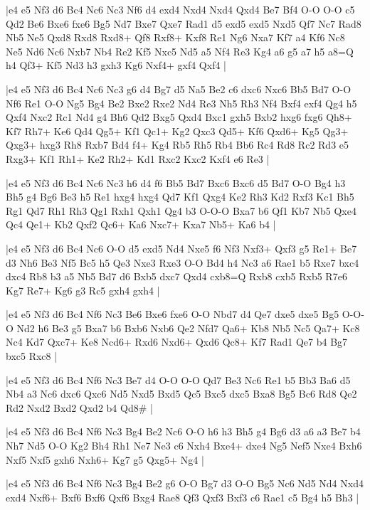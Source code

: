 \whitename{}
\blackname{}
\makegametitle
|e4 e5 Nf3 d6 Bc4 Nc6 Nc3 Nf6 d4 exd4 Nxd4 Nxd4 Qxd4 Be7 Bf4 O-O O-O c5 Qd2 Be6 Bxe6 fxe6 Bg5 Nd7 Bxe7 Qxe7 Rad1 d5 exd5 exd5 Nxd5 Qf7 Nc7 Rad8 Nb5 Ne5 Qxd8 Rxd8 Rxd8+ Qf8 Rxf8+ Kxf8 Re1 Ng6 Nxa7 Kf7 a4 Kf6 Nc8 Ne5 Nd6 Nc6 Nxb7 Nb4 Re2 Kf5 Nxc5 Nd5 a5 Nf4 Re3 Kg4 a6 g5 a7 h5 a8=Q h4 Qf3+ Kf5 Nd3 h3 gxh3 Kg6 Nxf4+ gxf4 Qxf4  |

\whitename{}
\blackname{}
\makegametitle
|e4 e5 Nf3 d6 Bc4 Nc6 Nc3 g6 d4 Bg7 d5 Na5 Be2 c6 dxc6 Nxc6 Bb5 Bd7 O-O Nf6 Re1 O-O Ng5 Bg4 Be2 Bxe2 Rxe2 Nd4 Re3 Nh5 Rh3 Nf4 Bxf4 exf4 Qg4 h5 Qxf4 Nxc2 Rc1 Nd4 g4 Bh6 Qd2 Bxg5 Qxd4 Bxc1 gxh5 Bxb2 hxg6 fxg6 Qh8+ Kf7 Rh7+ Ke6 Qd4 Qg5+ Kf1 Qc1+ Kg2 Qxc3 Qd5+ Kf6 Qxd6+ Kg5 Qg3+ Qxg3+ hxg3 Rh8 Rxb7 Bd4 f4+ Kg4 Rb5 Rh5 Rb4 Bb6 Rc4 Rd8 Rc2 Rd3 e5 Rxg3+ Kf1 Rh1+ Ke2 Rh2+ Kd1 Rxc2 Kxc2 Kxf4 e6 Re3  |

\whitename{}
\blackname{}
\makegametitle
|e4 e5 Nf3 d6 Bc4 Nc6 Nc3 h6 d4 f6 Bb5 Bd7 Bxc6 Bxc6 d5 Bd7 O-O Bg4 h3 Bh5 g4 Bg6 Be3 h5 Re1 hxg4 hxg4 Qd7 Kf1 Qxg4 Ke2 Rh3 Kd2 Rxf3 Kc1 Bh5 Rg1 Qd7 Rh1 Rh3 Qg1 Rxh1 Qxh1 Qg4 b3 O-O-O Bxa7 b6 Qf1 Kb7 Nb5 Qxe4 Qc4 Qe1+ Kb2 Qxf2 Qc6+ Ka6 Nxc7+ Kxa7 Nb5+ Ka6 b4  |

\whitename{}
\blackname{}
\makegametitle
|e4 e5 Nf3 d6 Bc4 Nc6 O-O d5 exd5 Nd4 Nxe5 f6 Nf3 Nxf3+ Qxf3 g5 Re1+ Be7 d3 Nh6 Be3 Nf5 Bc5 h5 Qe3 Nxe3 Rxe3 O-O Bd4 h4 Nc3 a6 Rae1 b5 Rxe7 bxc4 dxc4 Rb8 b3 a5 Nb5 Bd7 d6 Bxb5 dxc7 Qxd4 cxb8=Q Rxb8 cxb5 Rxb5 R7e6 Kg7 Re7+ Kg6 g3 Rc5 gxh4 gxh4  |

\whitename{}
\blackname{}
\makegametitle
|e4 e5 Nf3 d6 Bc4 Nf6 Nc3 Be6 Bxe6 fxe6 O-O Nbd7 d4 Qe7 dxe5 dxe5 Bg5 O-O-O Nd2 h6 Be3 g5 Bxa7 b6 Bxb6 Nxb6 Qe2 Nfd7 Qa6+ Kb8 Nb5 Nc5 Qa7+ Kc8 Nc4 Kd7 Qxc7+ Ke8 Ncd6+ Rxd6 Nxd6+ Qxd6 Qc8+ Kf7 Rad1 Qe7 b4 Bg7 bxc5 Rxc8  |

\whitename{}
\blackname{}
\makegametitle
|e4 e5 Nf3 d6 Bc4 Nf6 Nc3 Be7 d4 O-O O-O Qd7 Be3 Nc6 Re1 b5 Bb3 Ba6 d5 Nb4 a3 Nc6 dxc6 Qxc6 Nd5 Nxd5 Bxd5 Qc5 Bxc5 dxc5 Bxa8 Bg5 Bc6 Rd8 Qe2 Rd2 Nxd2 Bxd2 Qxd2 b4 Qd8\#  |

\whitename{}
\blackname{}
\makegametitle
|e4 e5 Nf3 d6 Bc4 Nf6 Nc3 Bg4 Be2 Nc6 O-O h6 h3 Bh5 g4 Bg6 d3 a6 a3 Be7 b4 Nh7 Nd5 O-O Kg2 Bh4 Rh1 Ne7 Ne3 c6 Nxh4 Bxe4+ dxe4 Ng5 Nef5 Nxe4 Bxh6 Nxf5 Nxf5 gxh6 Nxh6+ Kg7 g5 Qxg5+ Ng4  |

\whitename{}
\blackname{}
\makegametitle
|e4 e5 Nf3 d6 Bc4 Nf6 Nc3 Bg4 Be2 g6 O-O Bg7 d3 O-O Bg5 Nc6 Nd5 Nd4 Nxd4 exd4 Nxf6+ Bxf6 Bxf6 Qxf6 Bxg4 Rae8 Qf3 Qxf3 Bxf3 c6 Rae1 c5 Bg4 h5 Bh3  |

